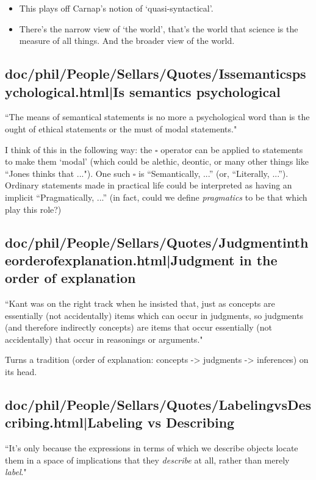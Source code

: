 \documentclass[12pt,a4paper]{report}
\begin{document}
\begin{itemize}
    \item This plays off Carnap's notion of `quasi-syntactical'.
    \item There's the narrow view of `the world', that's the world that science
          is the measure of all things. And the broader view of the world.
\end{itemize}

\subsection{doc/phil/People/Sellars/Quotes/Issemanticspsychological.html|Is semantics psychological}
``The means of semantical statements is no more a psychological word than is
the ought of ethical statements or the must of modal statements."

I think of this in the following way: the $\square$ operator can be applied to
statements to make them `modal' (which could be alethic, deontic, or many other
things like ``Jones thinks that ..."). One such $\square$ is ``Semantically,
...'' (or, ``Literally, ...''). Ordinary statements made in practical life
 could be interpreted as having an implicit ``Pragmatically, ...'' (in fact,
 could we define \emph{pragmatics} to be that which play this role?)
\subsection{doc/phil/People/Sellars/Quotes/Judgmentintheorderofexplanation.html|Judgment in the order of explanation}

``Kant was on the right track when he insisted that, just as concepts are
essentially (not accidentally) items which can occur in judgments, so judgments
(and therefore indirectly concepts) are items that occur essentially (not
accidentally) that occur in reasonings or arguments."

Turns a tradition (order of explanation: concepts -> judgments -> inferences)
on its head.

\subsection{doc/phil/People/Sellars/Quotes/LabelingvsDescribing.html|Labeling vs Describing}
``It's only because the expressions in terms of which we describe objects locate
them in a space of implications that they \emph{describe} at all, rather than
merely \emph{label}."
\end{document}
